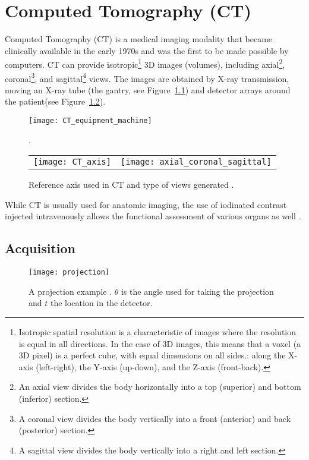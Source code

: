 \chapter{Computed Tomography (CT)}

Computed Tomography (CT) is a medical imaging modality that became
clinically available in the early 1970s and was the first to be made
possible by computers. CT can provide isotropic\footnote{Isotropic
  spatial resolution is a characteristic of images where the
  resolution is equal in all directions. In the case of 3D images,
  this means that a voxel (a 3D pixel) is a perfect cube, with equal
  dimensions on all sides.: along the X-axis (left-right), the Y-axis
  (up-down), and the Z-axis (front-back). } 3D images (volumes),
including axial\footnote{An axial view divides the body horizontally
  into a top (superior) and bottom (inferior) section.},
coronal\footnote{A coronal view divides the body vertically into a
  front (anterior) and back (posterior) section.}, and
sagittal\footnote{A sagittal view divides the body vertically into a
  right and left section.} views. The images are obtained by X-ray
transmission, moving an X-ray tube (the gantry, see
Figure~\ref{fig:CT_equipment_machine}) and detector arrays around the
patient(see Figure~\ref{fig:views_in_CT}).

\begin{figure}
  \centering
    \texttt{[image: CT\_equipment\_machine]}
  \caption{ \cite{morin2025radiation}.\label{fig:CT_equipment_machine}}
\end{figure}

\begin{figure}
  \centering
  \begin{tabular}{cc}
    \texttt{[image: CT\_axis]} & \texttt{[image: axial\_coronal\_sagittal]}
  \end{tabular}
  \caption{Reference axis used in CT and type of views generated \cite{morin2025radiation}.\label{fig:views_in_CT}}
\end{figure}

While CT is usually used for anatomic imaging, the use of
iodinated contrast injected intravenously allows the functional
assessment of various organs as well \cite{bushberg2011essential}.

\section{Acquisition}

\begin{figure}
  \centering
  \texttt{[image: projection]}
  \caption{A projection example \cite{takase2025CT}. $\theta$ is the
    angle used for taking the projection and $t$ the location in
    the detector.\label{fig:projection}}
\end{figure}

